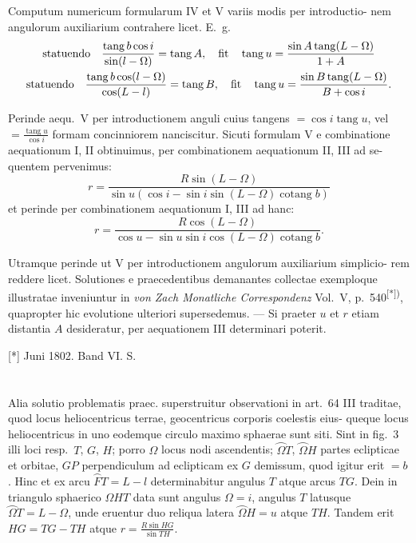 \documentclass[12pt,a4paper]{article}
\newcommand{\tang}{\mathop{\mathrm{tang}}\nolimits}
\newcommand{\cotang}{\mathop{\mathrm{cotang}}\nolimits}
\begin{document}
Computum numericum formularum IV et V variis modis per introductio-
nem angulorum auxiliarium contrahere licet. E.~g.
\begin{gather*}
\text{statuendo\quad } \frac{\tang b\cos i}{\sin(l - \Omega)} = \tang A, \quad \text{fit\quad} \tang u = \frac{\sin A\tang(L - \Omega)}{1 + A} \\
\text{statuendo\quad } \frac{\tang b\cos(l - \Omega)}{\cos(L - l)} = \tang B, \quad \text{fit\quad} \tang u = \frac{\sin B\tang(L - \Omega)}{B + \cos i}.
\end{gather*}

Perinde aequ.~V per introductionem anguli cuius tangens $= \cos i\tang u$, vel $=
\frac{\tang u}{\cos i}$ formam concinniorem nanciscitur. Sicuti formulam V e combinatione
aequationum I, II obtinuimus, per combinationem aequationum II, III ad se-
quentem pervenimus:
\[
r = \frac{R\sin(L - \Omega)}{\sin u(\cos i - \sin i\sin(L - \Omega)\cotang b)}
\]
et perinde per combinationem aequationum I, III ad hanc:
\[
r = \frac{R\cos(L - \Omega)}{\cos u - \sin u\sin i\cos(L - \Omega)\cotang b}.
\]

Utramque perinde ut V per introductionem angulorum auxiliarium simplicio-
rem reddere licet. Solutiones e praecedentibus demanantes collectae exemploque
illustratae inveniuntur in \textit{von Zach Monatliche Correspondenz} Vol.~V, p.~540\textsuperscript{[*])},
quapropter hic evolutione ulteriori supersedemus. --- Si praeter $u$ et $r$ etiam
distantia $A$ desideratur, per aequationem III determinari poterit.

\begin{flushright}
\small[*] Juni 1802. Band VI. S.
\end{flushright}

\section{}

Alia solutio problematis praec. superstruitur observationi in art.~64 III
traditae, quod locus heliocentricus terrae, geocentricus corporis coelestis eius-
queque locus heliocentricus in uno eodemque circulo maximo sphaerae sunt
siti. Sint in fig.~3 illi loci resp.~$T$, $G$, $H$; porro $\Omega$ locus nodi ascendentis;
$\wideparen\Omega T$, $\wideparen\Omega H$ partes eclipticae et orbitae, $GP$ perpendiculum ad eclipticam ex $G$
demissum, quod igitur erit $= b$. Hinc et ex arcu $\wideparen FT = L - l$ determinabitur
angulus $T$ atque arcus $TG$. Dein in triangulo sphaerico $\Omega HT$ data sunt
angulus $\Omega = i$, angulus $T$ latusque $\wideparen\Omega T = L - \Omega$, unde eruentur duo reliqua
latera $\wideparen\Omega H = u$ atque $TH$. Tandem erit $HG = TG - TH$ atque $r = \frac{R\sin HG}{\sin TH}$.
\end{document}
